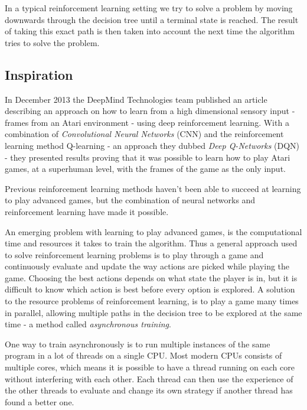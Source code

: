 \documentclass[11pt]{article}
\begin{document}
In a typical reinforcement learning setting we try to solve a problem
by moving downwards through the decision tree until a terminal state is reached.
The result of taking this exact path is then
taken into account the next time the algorithm tries to solve the problem.

\subsection{Inspiration}

In December 2013 the DeepMind Technologies team published an article
describing an approach on how to learn from a high dimensional sensory input -
frames from an Atari environment -
using deep reinforcement learning\cite{dqn}.
With a combination of \textit{Convolutional Neural Networks} (CNN) and
the reinforcement learning method Q-learning\cite{RLbook} - an approach they
dubbed \textit{Deep Q-Networks} (DQN) - they
presented results proving that it was possible to learn how to play Atari
games, at a superhuman level, with the frames of the game as the only input.

Previous reinforcement learning methods haven't been able to succeed at learning to play
advanced games, but the combination of neural networks and
reinforcement learning have made it possible.

An emerging problem with learning to play advanced games, is the computational time and
resources it takes to train the algorithm.
Thus a general approach used to solve reinforcement learning problems is to
play through a game and continuously evaluate and update the way actions are picked
while playing the game.
Choosing the best actions depends on what state the player is in, but it is difficult to
know which action is best before every option is explored.
A solution to the resource problems of reinforcement learning,
is to play a game many times in parallel,
allowing multiple paths in the decision tree to be explored at the same time -
a method called \textit{asynchronous training}.


One way to train asynchronously is to run multiple instances of the same program
in a lot of threads on a single CPU.
Most modern CPUs consists of multiple cores, which means it is possible to have a thread
running on each core without interfering with each other.
Each thread can then use the experience of the other threads 
to evaluate and change its own strategy if another thread
has found a better one.
\end{document}
